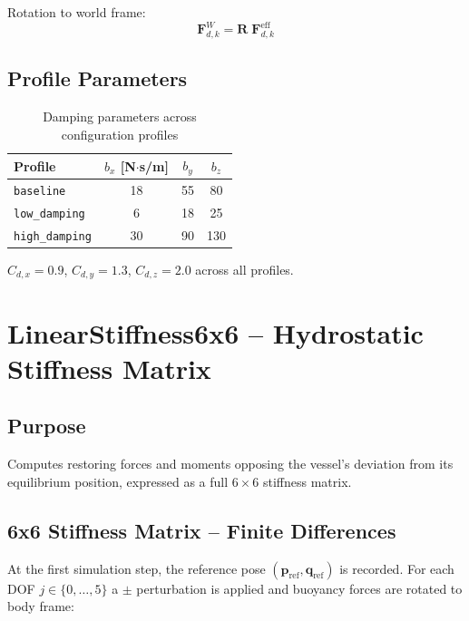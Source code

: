 \documentclass[12pt,a4paper]{article}
\begin{document}
Rotation to world frame:
\begin{equation}
  \mathbf{F}_{d,k}^W = \mathbf{R}\;\mathbf{F}_{d,k}^{\text{eff}}
  \label{eq:drag_world}
\end{equation}

\subsection{Profile Parameters}

\begin{table}[H]
  \centering
  \caption{Damping parameters across configuration profiles}
  \begin{tabular}{lccc}
    \toprule
    \textbf{Profile} & $b_x$ [N$\cdot$s/m] & $b_y$ & $b_z$ \\
    \midrule
    \texttt{baseline}      & 18  & 55  & 80  \\
    \texttt{low\_damping}  &  6  & 18  & 25  \\
    \texttt{high\_damping} & 30  & 90  & 130 \\
    \bottomrule
  \end{tabular}
  \par\smallskip
  {\small $C_{d,x}=0.9$, $C_{d,y}=1.3$, $C_{d,z}=2.0$ across all profiles.}
\end{table}

\section{LinearStiffness6x6 -- Hydrostatic Stiffness Matrix}

\subsection{Purpose}

Computes restoring forces and moments opposing the vessel's deviation
from its equilibrium position, expressed as a full $6\times6$ stiffness
matrix.

\subsection{6x6 Stiffness Matrix -- Finite Differences}

At the first simulation step, the reference pose
$(\mathbf{p}_{\text{ref}}, \mathbf{q}_{\text{ref}})$ is recorded.
For each DOF $j\in\{0,\ldots,5\}$ a $\pm$ perturbation is applied and
buoyancy forces are rotated to body frame:
\end{document}
